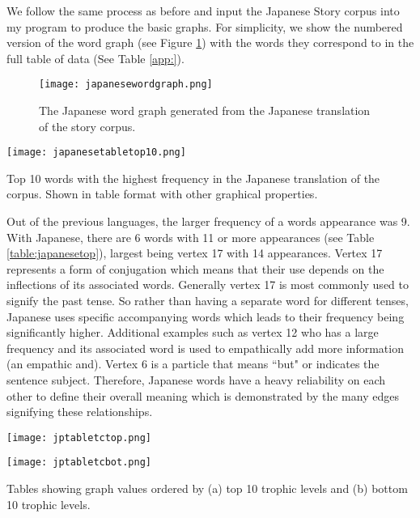 We follow the same process as before and input the Japanese Story corpus into my program to produce the basic graphs. For simplicity, we show the numbered version of the word graph (see Figure \ref{fig:jpgraph}) with the words they correspond to in the full table of data (See Table \ref{app:}).

\begin{figure}[H]
\centering
\texttt{[image: japanesewordgraph.png]}
\caption{The Japanese word graph generated from the Japanese translation of the story corpus.}
\label{fig:jpgraph}
\end{figure}

\begin{table}[H]
\centering
\texttt{[image: japanesetabletop10.png]}
\caption{Top 10 words with the highest frequency in the Japanese translation of the corpus. Shown in table format with other graphical properties. }
\label{table:japanesetop}
\end{table}

Out of the previous languages, the larger frequency of a words appearance was 9. With Japanese, there are 6 words with 11 or more appearances (see Table \ref{table:japanesetop}), largest being vertex 17 with 14 appearances. Vertex 17 represents a form of conjugation which means that their use depends on the inflections of its associated words. Generally vertex 17 is most commonly used to signify the past tense. So rather than having a separate word for different tenses, Japanese uses specific accompanying words which leads to their frequency being significantly higher. Additional examples such as vertex 12 who has a large frequency and its associated word is used to empathically add more information (an empathic and). Vertex 6 is a particle that means ``but" or indicates the sentence subject. Therefore, Japanese words have a heavy reliability on each other to define their overall meaning which is demonstrated by the many edges signifying these relationships.

\begin{table}[H]
\centering
\begin{subtable}{.45\textwidth}
	\centering
	\texttt{[image: jptabletctop.png]}
	\caption{}
	\label{table:japanesentoptc}
\end{subtable}
\hfill
\begin{subtable}{.45\textwidth}
	\centering
	\texttt{[image: jptabletcbot.png]}
	\caption{}
	\label{table:japanesebottc}
\end{subtable}
\caption{Tables showing graph values ordered by (a) top 10 trophic levels and (b) bottom 10 trophic levels.}
\end{table}

